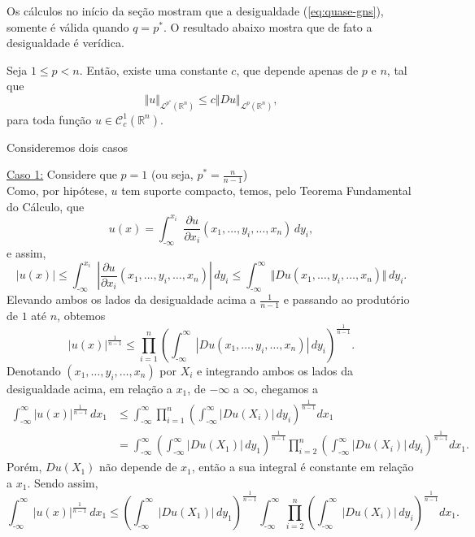 \documentclass[a4paper, 11pt]{book}
\theoremstyle{definition}
\newcommand{\m}{\text{-}}
\newcommand{\bR}{\mathbb{R}}
\newcommand{\cC}{\mathcal{C}}
\newcommand{\cL}{\mathcal{L}}
\begin{document}
Os cálculos no início da seção mostram que a desigualdade (\ref{eq:quase-gns}), somente é válida quando $q = p^*$. O resultado abaixo mostra que de fato a desigualdade é verídica.

\begin{tbox} Seja $1 \leqslant p < n$. Então, existe uma constante $c$, que depende apenas de $p$ e $n$, tal que
\begin{equation} \label{eq:gns}
    \Vert u \Vert_{\cL^{p^*}(\bR^n)} \leqslant c \Vert Du \Vert_{\cL^p(\bR^n)},
\end{equation}
para toda função $u \in \cC^1_c(\bR^n)$.
\end{tbox}
\begin{prf}
    Consideremos dois casos

    \underline{Caso 1:} Considere que $p = 1$ (ou seja, $p^* = \frac{n}{n-1}$)\\
    Como, por hipótese, $u$ tem suporte compacto, temos, pelo Teorema Fundamental do Cálculo, que
    \[
        u(x) = \int_{\m\infty}^{x_i} \dfrac{\partial u}{\partial x_i}(x_1,\dots,y_i,\dots,x_n) \, dy_i,
    \]
    e assim,
    \[
        |u(x)| \leqslant \int_{\m\infty}^{x_i} \left|\dfrac{\partial u}{\partial x_i}(x_1,\dots,y_i,\dots,x_n)\right| \, dy_i  \leqslant \int_{\m\infty}^{\infty} \Vert Du(x_1,\dots,y_i,\dots,x_n) \Vert \,dy_i.
    \]
    Elevando ambos os lados da desigualdade acima a $\frac{1}{n-1}$ e passando ao produtório de $1$ até $n$, obtemos
    \[
        |u(x)|^{\frac{1}{n-1}} \leqslant \prod_{i=1}^n \left( \int_{\m\infty}^{\infty} |Du(x_1,\dots,y_i,\dots,x_n)| \,dy_i \right)^{\frac{1}{n-1}}.
    \]
    Denotando $(x_1,\dots,y_i,\dots,x_n)$ por $X_i$ e integrando ambos os lados da desigualdade acima, em relação a $x_1$, de $-\infty$ a $\infty$, chegamos a
    \[
        \begin{aligned}
            \int_{\m\infty}^{\infty} |u(x)|^{\frac{1}{n-1}} \,dx_1 &\leqslant \int_{\m\infty}^{\infty} \prod_{i=1}^n \left( \int_{\m\infty}^{\infty} |Du(X_i)| \,dy_i \right)^{\frac{1}{n-1}}  dx_1\\ 
            &= \int_{\m\infty}^{\infty} \left( \int_{\m\infty}^{\infty} |Du(X_1)| \,dy_1 \right)^{\frac{1}{n-1}}  \prod_{i=2}^n \left(\int_{\m\infty}^{\infty} |Du(X_i)| \, dy_i\right)^{\frac{1}{n-1}} dx_1.
        \end{aligned}
    \]
    Porém, $Du(X_1)$ não depende de $x_1$, então a sua integral é constante em relação a $x_1$. Sendo assim,
    \[
        \int_{\m\infty}^{\infty} |u(x)|^{\frac{1}{n-1}} \,dx_1 \leqslant \left( \int_{\m\infty}^{\infty} |Du(X_1)| \,dy_1 \right)^{\frac{1}{n-1}}\int_{\m\infty}^{\infty}   \prod_{i=2}^n \left(\int_{\m\infty}^{\infty} |Du(X_i)| \, dy_i\right)^{\frac{1}{n-1}} dx_1.
\]
\end{prf}
\end{document}
